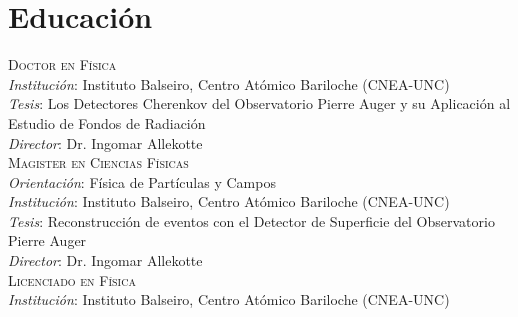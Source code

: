 \section*{Educación}
\noindent
{}\textsc{Doctor en Física}\\
{\emph{Institución}}: Instituto Balseiro, Centro Atómico Bariloche (CNEA-UNC)\\
{\emph{Tesis}}: Los Detectores Cherenkov del Observatorio Pierre Auger y su Aplicación al Estudio de Fondos de Radiación\\
{\emph{Director}}: Dr. Ingomar Allekotte\\
\textsc{Magister en Ciencias Físicas}\\
{\emph{Orientación}}: Física de Partículas y Campos\\
{\emph{Institución}}: Instituto Balseiro, Centro Atómico Bariloche (CNEA-UNC)\\
{\emph{Tesis}}: Reconstrucción de eventos con el Detector de Superficie del Observatorio Pierre Auger\\
{\emph{Director}}: Dr. Ingomar Allekotte\\ 
\textsc{Licenciado en Física}\\
{\emph{Institución}}: Instituto Balseiro, Centro Atómico Bariloche (CNEA-UNC)\\
\fi
